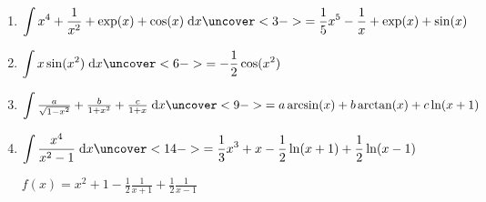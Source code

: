 \begin{frame}
\begin{enumerate}
  \item $\displaystyle\int x^4 + \frac{1}{x^2} + \exp(x)+ \cos(x) \; \dd x 
  \uncover<3->{= \frac15 x^5 - \frac1x + \exp(x) + \sin(x)}$
  
  \pause
  
  \medskip
  \pause\pause
  
  
  \item $\displaystyle\int  x \sin(x^2) \; \dd x 
  \uncover<6->{= - \frac12\cos(x^2)}$
  
  \pause
  
  \medskip
  \pause\pause
   
  \item $\displaystyle\int \tfrac{a}{\sqrt{1-x^2}} + \tfrac{b}{1+x^2} + \tfrac{c}{1+x} \; \dd x
  \uncover<9->{= a\arcsin(x) + b\arctan(x) + c\ln(x + 1)}$
  
  \pause
  
  
  \medskip
  \pause\pause
  
  \item $\displaystyle\int \frac{x^4}{x^2-1} \; \dd x 
  \uncover<14->{= \frac13 x^3 + x - \frac12 \ln(x + 1) + \frac12 \ln(x - 1)}$ 
  
  \pause
  
  
  \pause
  
  $f(x) = x^2 + 1 - \frac12\frac{1}{x + 1} + \frac12\frac{1}{x - 1}$ 
  
  \pause  
  
  
%  
%  
%  
%  
%  
\end{enumerate}

\end{frame}


